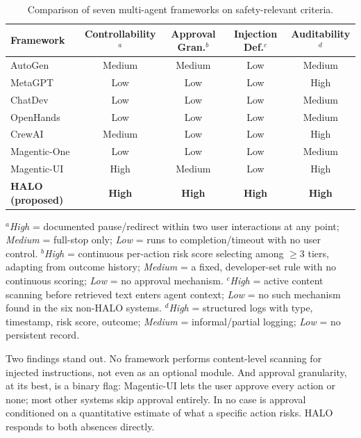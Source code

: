 \documentclass[a4paper, 11pt]{article}
\begin{document}
\begin{table}[H]
\centering
\caption{Comparison of seven multi-agent frameworks on safety-relevant criteria.}
\label{tab:comparison}
\scriptsize
\begin{tabular}{lcccc}
\toprule
\textbf{Framework} & \textbf{Controllability}$^a$ & \textbf{Approval Gran.}$^b$
                   & \textbf{Injection Def.}$^c$ & \textbf{Auditability}$^d$ \\
\midrule
AutoGen        & Medium & Medium & Low    & Medium \\
MetaGPT        & Low    & Low    & Low    & High   \\
ChatDev        & Low    & Low    & Low    & Medium \\
OpenHands      & Low    & Low    & Low    & Medium \\
CrewAI         & Medium & Low    & Low    & High   \\
Magentic-One   & Low    & Low    & Low    & Medium \\
Magentic-UI    & High   & Medium & Low    & High   \\
\midrule
\textbf{HALO (proposed)} & \textbf{High} & \textbf{High} & \textbf{High} & \textbf{High} \\
\bottomrule
\end{tabular}
\vspace{2pt}
\begin{minipage}{0.97\textwidth}
\scriptsize
$^a$\textit{High} = documented pause/redirect within two user interactions at any
point; \textit{Medium} = full-stop only; \textit{Low} = runs to completion/timeout
with no user control.\quad
$^b$\textit{High} = continuous per-action risk score selecting among $\geq$3
tiers, adapting from outcome history; \textit{Medium} = a fixed, developer-set
rule with no continuous scoring; \textit{Low} = no approval mechanism.\quad
$^c$\textit{High} = active content scanning before retrieved text enters agent
context; \textit{Low} = no such mechanism found in the six non-HALO systems.\quad
$^d$\textit{High} = structured logs with type, timestamp, risk score, outcome;
\textit{Medium} = informal/partial logging; \textit{Low} = no persistent record.
\end{minipage}
\end{table}

Two findings stand out. No framework performs content-level scanning for injected
instructions, not even as an optional module. And approval granularity, at its
best, is a binary flag: Magentic-UI lets the user approve every action or none;
most other systems skip approval entirely. In no case is approval conditioned on
a quantitative estimate of what a specific action risks. HALO responds to both
absences directly.
\end{document}

